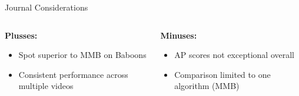 \begin{frame}{Journal Considerations}
    \begin{columns}
        \begin{column}{0.48\textwidth}
            \textbf{Plusses:}
            \begin{itemize}
                \item Spot superior to MMB on Baboons
                \item Consistent performance across multiple videos
            \end{itemize}
        \end{column}
        \begin{column}{0.48\textwidth}
            \textbf{Minuses:}
            \begin{itemize}
                \item AP scores not exceptional overall
                \item Comparison limited to one algorithm (MMB)
            \end{itemize}
        \end{column}
    \end{columns}
\end{frame}